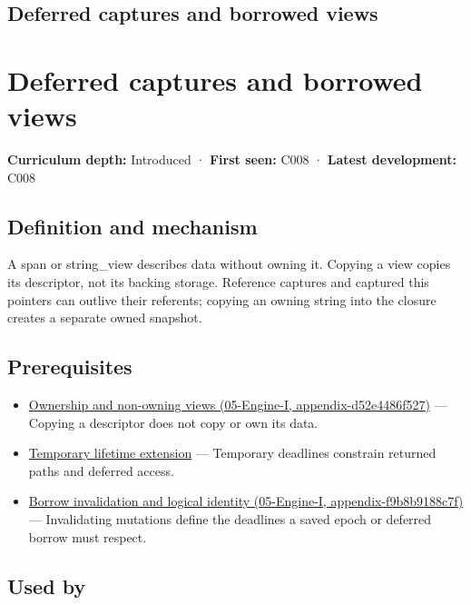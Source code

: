 \hypertarget{appendix-aea529eb5175}{}
\section*{Deferred captures and borrowed views}
\chapter{Deferred captures and borrowed views}\label{appendix-aea529eb5175-deferred-captures-and-borrowed-views}

\textbf{Curriculum depth:} Introduced · \textbf{First seen:} C008 · \textbf{Latest development:} C008

\section{Definition and mechanism}\label{appendix-aea529eb5175-definition-and-mechanism}

A span or string\_view describes data without owning it. Copying a view copies its descriptor, not its backing storage. Reference captures and captured this pointers can outlive their referents; copying an owning string into the closure creates a separate owned snapshot.

\section{Prerequisites}\label{appendix-aea529eb5175-prerequisites}

\begin{itemize}
\tightlist
\item
  \href{../05-Engine-I/main.pdf\#nameddest=appendix-d52e4486f527}{Ownership and non-owning views (05-Engine-I, appendix-d52e4486f527)} --- Copying a descriptor does not copy or own its data.
\item
  \hyperref[appendix-a978b29bbbb0]{Temporary lifetime extension} --- Temporary deadlines constrain returned paths and deferred access.
\item
  \href{../05-Engine-I/main.pdf\#nameddest=appendix-f9b8b9188c7f}{Borrow invalidation and logical identity (05-Engine-I, appendix-f9b8b9188c7f)} --- Invalidating mutations define the deadlines a saved epoch or deferred borrow must respect.
\end{itemize}

\section{Used by}\label{appendix-aea529eb5175-used-by}

